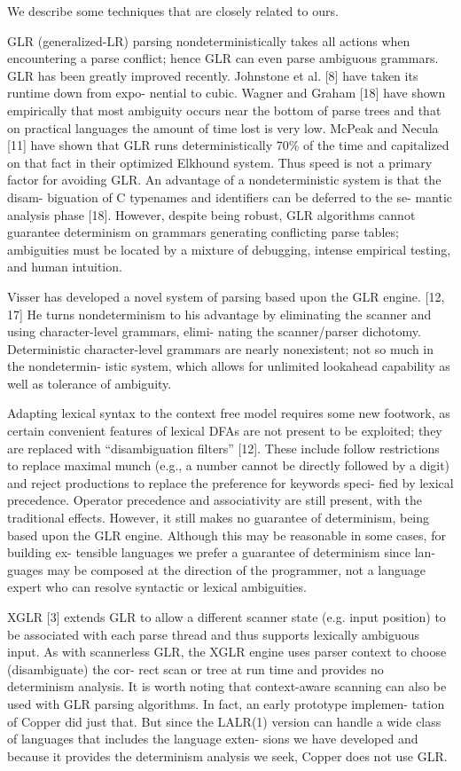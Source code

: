 We describe some techniques that are closely related to ours.


GLR (generalized-LR) parsing nondeterministically takes all actions
when encountering a parse conflict; hence GLR can even parse ambiguous
grammars. GLR has been greatly improved recently. Johnstone et
al. [8] have taken its runtime down from expo- nential to cubic.
Wagner and Graham [18] have shown empirically that most ambiguity
occurs near the bottom of parse trees and that on practical languages
the amount of time lost is very low. McPeak and Necula [11] have
shown that GLR runs deterministically 70\% of the time and capitalized
on that fact in their optimized Elkhound system. Thus speed is not
a primary factor for avoiding GLR.  An advantage of a nondeterministic
system is that the disam- biguation of C typenames and identifiers
can be deferred to the se- mantic analysis phase [18]. However,
despite being robust, GLR algorithms cannot guarantee determinism
on grammars generating conflicting parse tables; ambiguities must
be located by a mixture of debugging, intense empirical testing,
and human intuition.  

Visser has developed a novel system of parsing
based upon the GLR engine. [12, 17] He turns nondeterminism to his
advantage by eliminating the scanner and using character-level
grammars, elimi- nating the scanner/parser dichotomy. Deterministic
character-level grammars are nearly nonexistent; not so much in the
nondetermin- istic system, which allows for unlimited lookahead
capability as well as tolerance of ambiguity.

Adapting lexical
syntax to the context free model requires some new footwork, as
certain convenient features of lexical DFAs are not present to be
exploited; they are replaced with “disambiguation filters” [12].
These include follow restrictions to replace maximal munch (e.g.,
a number cannot be directly followed by a digit) and reject productions
to replace the preference for keywords speci- fied by lexical
precedence. Operator precedence and associativity are still present,
with the traditional effects. However, it still makes no guarantee
of determinism, being based upon the GLR engine. Although this may
be reasonable in some cases, for building ex- tensible languages
we prefer a guarantee of determinism since lan- guages may be
composed at the direction of the programmer, not a language expert
who can resolve syntactic or lexical ambiguities.  


XGLR [3] extends
GLR to allow a different scanner state (e.g. input position) to be
associated with each parse thread and thus supports lexically
ambiguous input. As with scannerless GLR, the XGLR engine uses
parser context to choose (disambiguate) the cor- rect scan or tree
at run time and provides no determinism analysis.  It is worth
noting that context-aware scanning can also be used with GLR parsing
algorithms. In fact, an early prototype implemen- tation of Copper
did just that. But since the LALR(1) version can handle a wide class
of languages that includes the language exten- sions we have developed
and because it provides the determinism analysis we seek, Copper
does not use GLR.  



